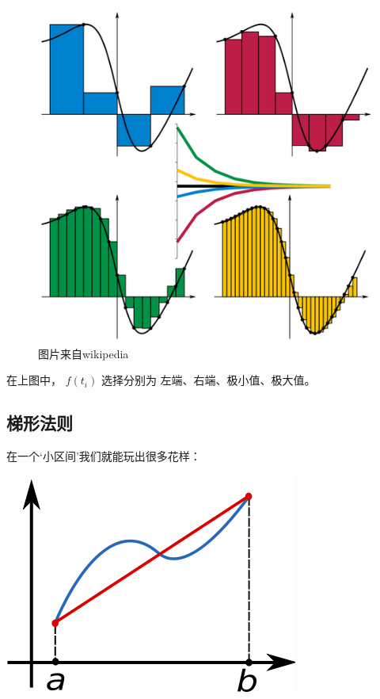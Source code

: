 \documentclass[
]{book}
\begin{document}
\begin{figure}
\centering
\includegraphics{images/480px-Riemann_sum_convergence.png}
\caption{图片来自wikipedia}
\end{figure}

在上图中， \(f(t_i)\) 选择分别为 左端、右端、极小值、极大值。

\hypertarget{ux68afux5f62ux6cd5ux5219}{%
\subsection{梯形法则}\label{ux68afux5f62ux6cd5ux5219}}

在一个`小区间'我们就能玩出很多花样：

\includegraphics{images/365px-Trapezoidal_rule_illustration.png}
\end{document}
